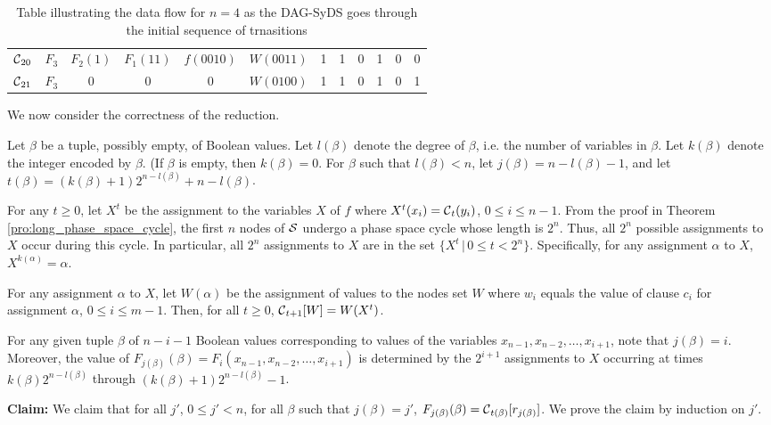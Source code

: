 \begin{table*}
\begin{center}
\begin{tabular}{|l | c c c c c c c c c c c |}
$\mbox{$\mathcal{C}$}_{20}$ & $F_3$ & $F_2(1)$ & $F_1(11)$ & $f(0010)$ & $W(0011)$ & 1 & 1 & 0 & 1 & 0 & 0 \\ 
$\mbox{$\mathcal{C}$}_{21}$ & $F_3$ & 0 & 0 & 0 & $W(0100)$ & 1 & 1 & 0 & 1 & 0 & 1 \\ 
\end{tabular}
\end{center}
\caption{Table illustrating the data flow for $n = 4$ 
as the DAG-SyDS \cals{} goes through the initial sequence of trnasitions}
\label{tab:dag_syds_trans}
\end{table*}

\bigskip
We now consider the correctness of the reduction.

Let $\beta$ be a tuple, possibly empty, of Boolean values. 
Let  $l(\beta)$ denote the degree of $\beta$,
i.e. the number of variables in $\beta$.
Let  $k(\beta)$ denote the integer encoded by $\beta$.
(If  $\beta$ is empty, then $k(\beta) = 0$.
For $\beta$ such that $l(\beta) < n$, 
let $j(\beta) = n - l(\beta) -1$,
and let $t(\beta) = (k(\beta)+1) 2^{n-l(\beta)} +n -l(\beta)$. 

For any $ t \geq 0$,
let  $X^t$ be the assignment to the variables $X$ of $f$ where 
$X^t(x_i) = \mbox{$\mathcal{C}$} _t(y_i)$, $ 0 \leq i \leq n-1$.
From the proof in Theorem \ref{pro:long_phase_space_cycle}, 
the first $n$ nodes of $\mbox{$\mathcal{S}$}$ undergo a phase space cycle whose length is $2^n$.
Thus, all $2^n$ possible assignments to $X$ occur during this cycle.
In particular, all $2^n$ assignments to $X$ are in the set $\{  X^t \, | \, 0 \leq t < 2^n \}$.
Specifically, for any assignment $\alpha$ to $X$, $X^{k(\alpha)} = \alpha$.


For any assignment $\alpha$ to $X$, 
let $W(\alpha)$ be the assignment of values to the nodes set $W$ 
where $w_i$ equals the value of clause $c_i$ for assignment $\alpha$, $ 0 \leq i \leq m-1$.
Then,  for all $t \geq 0$, $\mbox{$\mathcal{C}$}_{t+1}[W] = W(X^t)$.

For any given tuple $\beta$ of  $n-i-1$ Boolean values 
corresponding to values of the variables $x_{n-1}, x_{n-2}, \ldots , x_{i+1}$,
note that $j(\beta) = i$.
Moreover, the value of $F_{j(\beta)}(\beta) = F_i(x_{n-1}, x_{n-2}, \ldots , x_{i+1})$
is determined by the $2^{i+1}$ assignments to $X$  occurring at times 
$k(\beta) 2^{n-l(\beta)}$ through $(k(\beta)+1) 2^{n-l(\beta)}-1$.

{\bf Claim:} We claim that for all $j'$, $0 \leq j' < n$,
for all $\beta$ such that $j(\beta) = j'$,
$F_{j(\beta)}(\beta) =\mbox{$\mathcal{C}$}_{t(\beta)}[r_{j(\beta)}]$.
We prove the claim by induction on $j'$.

